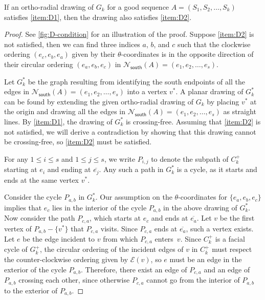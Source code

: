 \documentclass{theoretics}
\newcommand{\EE}{\mathcal{E}}
\newcommand{\Nsouth}{\mathcal{N}_\mathsf{south}}
\begin{document}
 \begin{lemma}\label{lem:good-drawing-condition}
If an ortho-radial drawing of $G_k$ for a good sequence $A=(S_1, S_2, \ldots, S_{k})$ satisfies \ref{item:D1}, then the drawing also satisfies \ref{item:D2}.
 \end{lemma}
 \begin{proof}
 See \cref{fig:D-condition} for an illustration of the proof.
 Suppose \ref{item:D2} is not satisfied, then we can find three indices $a$, $b$, and $c$ such that the clockwise ordering $(e_c, e_b, e_a)$  given  by their $\theta$-coordinates is in the opposite direction of their circular ordering $(e_a, e_b, e_c)$ in $\Nsouth(A) = (e_1, e_2, \ldots, e_s)$. 
 
 Let $G_k^\ast$ be the graph resulting from identifying the south endpoints of all the edges in $\Nsouth(A) = (e_1, e_2, \ldots, e_s)$ into a vertex $v^\ast$. 
 A planar drawing of $G_k^\ast$ can be found by extending the given ortho-radial drawing of $G_k$ by placing $v^\ast$ at the origin and drawing all the edges in $\Nsouth(A) = (e_1, e_2, \ldots, e_s)$ as straight lines. By \ref{item:D1}, the drawing of $G_k^\ast$ is crossing-free. Assuming that \ref{item:D2} is not satisfied, we will derive a contradiction by showing that this drawing cannot be crossing-free, so \ref{item:D2} must be satisfied.
 
For any $1 \leq i \leq s$ and $1 \leq j \leq s$, we write $P_{i,j}$ to denote the subpath of $C_k^+$ starting at $e_i$ and ending at $\overline{e_j}$. Any such a path in $G_k^\ast$ is a cycle, as it starts and ends at the same vertex $v^\ast$.

Consider the cycle $P_{a,b}$ in $G_k^\ast$. Our assumption on the $\theta$-coordinates for $\{e_a, e_b, e_c\}$ implies that $e_c$ lies in the interior of the cycle $P_{a,b}$ in the above drawing of $G_k^\ast$. Now consider the path $P_{c,a}$, which starts at $e_c$ and ends at $\overline{e_a}$. Let $v$ be the first vertex of $P_{a,b} - \{v^\ast\}$ that $P_{c,a}$ visits. Since  $P_{c,a}$ ends at $\overline{e_a}$, such a vertex exists. Let $e$ be the edge incident to $v$ from which $P_{c,a}$ enters~$v$. Since $C_k^+$ is a facial cycle of $G_k^+$, the circular ordering of the incident edges of $v$ in $C_k^+$  must respect the counter-clockwise ordering given by $\EE(v)$, so $e$ must be an edge in the exterior of the cycle $P_{a,b}$. Therefore, there exist an edge of $P_{c,a}$ and an edge of $P_{a,b}$ crossing each other, since otherwise $P_{c,a}$ cannot go from the interior of $P_{a,b}$ to the exterior of $P_{a,b}$. 
 \end{proof}
\end{document}
